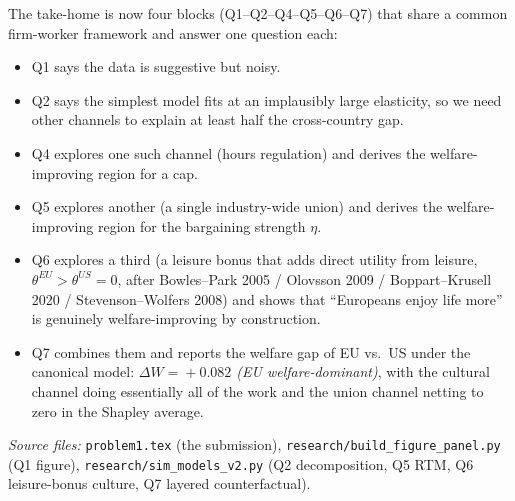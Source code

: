 \documentclass[11pt,a4paper]{article}
\begin{document}
The take-home is now four blocks (Q1--Q2--Q4--Q5--Q6--Q7) that share a
common firm-worker framework and answer one question each:
\begin{itemize}
\item Q1 says the data is suggestive but noisy.
\item Q2 says the simplest model fits at an implausibly large
elasticity, so we need other channels to explain at least half the
cross-country gap.
\item Q4 explores one such channel (hours regulation) and derives the
welfare-improving region for a cap.
\item Q5 explores another (a single industry-wide union) and derives
the welfare-improving region for the bargaining strength $\eta$.
\item Q6 explores a third (a leisure bonus that adds direct utility
from leisure, $\theta^{EU}\!>\!\theta^{US}\!=\!0$, after Bowles--Park
2005 / Olovsson 2009 / Boppart--Krusell 2020 / Stevenson--Wolfers
2008) and shows that ``Europeans enjoy life more'' is genuinely
welfare-improving by construction.
\item Q7 combines them and reports the welfare gap of EU vs.\ US under
the canonical model: \emph{$\Delta W\!=\!+0.082$ (EU welfare-dominant)},
with the cultural channel doing essentially all of the work and the
union channel netting to zero in the Shapley average.
\end{itemize}

\bigskip
\noindent\emph{Source files:} \texttt{problem1.tex} (the submission),
\texttt{research/build\_figure\_panel.py} (Q1 figure),
\texttt{research/sim\_models\_v2.py} (Q2 decomposition, Q5 RTM, Q6
leisure-bonus culture, Q7 layered counterfactual).
\end{document}
